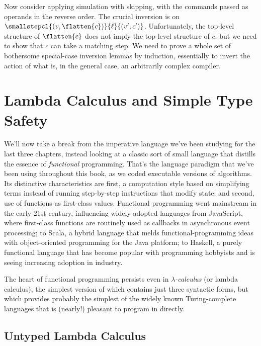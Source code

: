 \documentclass{amsbook}
\theoremstyle{definition}
\theoremstyle{remark}
\numberwithin{section}{chapter}
\numberwithin{equation}{chapter}
\begin{document}
Now consider applying simulation with skipping, with the commands passed as operands in the reverse order.
The crucial inversion is on $\smallstepcl{(v, \flatten{c})}{\ell}{(v', c')}$.
Unfortunately, the top-level structure of $\flatten{c}$ does not imply the top-level structure of $c$, but we need to show that $c$ can take a matching step.
We need to prove a whole set of bothersome special-case inversion lemmas by induction, essentially to invert the action of what is, in the general case, an arbitrarily complex compiler.



\chapter{Lambda Calculus and Simple Type Safety}\label{types}

We'll now take a break from the imperative language we've been studying for the last three chapters, instead looking at a classic sort of small language that distills the essence of \emph{functional} programming.
That's the language paradigm that we've been using throughout this book, as we coded executable versions of algorithms.
Its distinctive characteristics are first, a computation style based on simplifying terms instead of running step-by-step instructions that modify state; and second, use of functions as first-class values.
Functional programming went mainstream in the early 21st century, influencing widely adopted languages from JavaScript, where first-class functions are routinely used as callbacks in asynchronous event processing; to Scala, a hybrid language that melds functional-programming ideas with object-oriented programming for the Java platform; to Haskell, a purely functional language that has become popular with programming hobbyists and is seeing increasing adoption in industry.

The heart of functional programming persists even in \emph{$\lambda$-calculus} (or lambda calculus), the simplest version of which contains just three syntactic forms, but which provides probably the simplest of the widely known Turing-complete languages that is (nearly!) pleasant to program in directly.


\section{Untyped Lambda Calculus}
\end{document}
